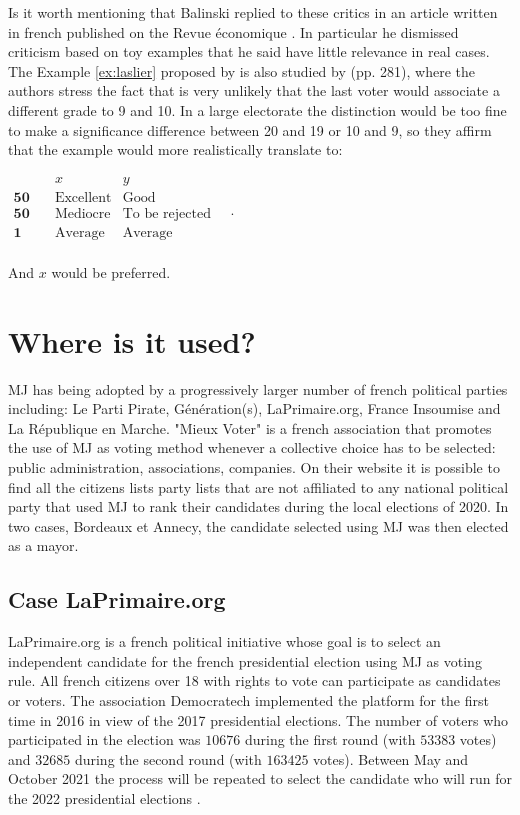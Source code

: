 \documentclass[version=3.21, pagesize, twoside=off, bibliography=totoc, DIV=calc, fontsize=12pt, a4paper]{scrartcl}
\begin{document}
Is it worth mentioning that Balinski replied to these critics in an article written in french published on the Revue économique \citep{Balinski2019}. In particular he dismissed criticism based on toy examples that he said have little relevance in real cases. The Example \ref{ex:laslier} proposed by \citet{Laslier2018} is also studied by \citet{Balinski2011} (pp. 281), where the authors stress the fact that is very unlikely that the last voter would associate a different grade to 9 and 10. In a large electorate the distinction would be too fine to make a significance difference between 20 and 19 or 10 and 9, so they affirm that the example would more realistically translate to: 
	\begin{center}
		$
		\begin{array}{ccc}
			& x & y \\
			\mathbf{50} \quad &\text{Excellent}&\text{Good}\\
			\mathbf{50} \quad &\text{Mediocre}&\text{To be rejected}\\
			\mathbf{1} \quad &\text{Average}&\text{Average}\\
		\end{array}\quad .
		$
	\end{center}
And $x$ would be preferred.

\section{Where is it used?}
\acs{MJ} has being adopted by a progressively larger number of french political parties including: Le Parti Pirate, Génération(s), LaPrimaire.org, France Insoumise and La République en Marche.
"Mieux Voter" \citep{MV} is a french association that promotes the use of \acs{MJ} as voting method whenever a collective choice has to be selected: public administration, associations, companies. On their website it is possible to find all the citizens lists \textendash party lists that are not affiliated to any national political party \textemdash that used \acs{MJ} to rank their candidates during the local elections of 2020. In two cases, Bordeaux et Annecy, the candidate selected using \acs{MJ} was then elected as a mayor. 


\subsection{Case LaPrimaire.org}
LaPrimaire.org \citep{LaPrimaire} is a french political initiative whose goal is to select an independent candidate for the french presidential election using \acs{MJ} as voting rule. All french citizens over 18 with rights to vote can participate as candidates or voters. The association Democratech implemented the platform for the first time in 2016 in view of the 2017 presidential elections. The number of voters who participated in the election was $10676$ during the first round (with $53383$ votes) and $32685$ during the second round (with $163425$ votes). Between May and October 2021 the process will be repeated to select the candidate who will run for the 2022 presidential elections \citep{LaPrimaire2022}.
\end{document}
